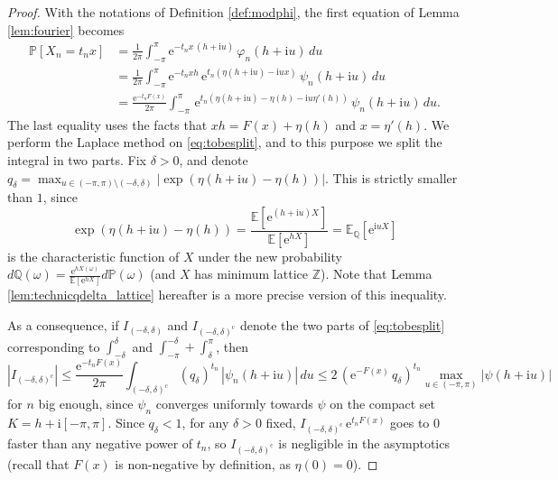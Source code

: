 \documentclass[12pt,a4paper,reqno]{amsart}
\theoremstyle{remark}
\newcommand{\Z}{\mathbb{Z}}
\newcommand{\E}{\mathrm{e}}
\newcommand{\I}{\mathrm{i}}
\newcommand{\esper}{\mathbb{E}}
\newcommand{\proba}{\mathbb{P}}
\begin{document}
\begin{proof}
With the notations of Definition \ref{def:modphi}, the first equation of Lemma \ref{lem:fourier} becomes
\begin{align}\proba[X_{n}=t_{n}x]&=\frac{1}{2\pi}\int_{-\pi}^{\pi} \E^{-t_{n}x\, (h+\I u)}\,\varphi_{n}(h + \I u)\,du\nonumber\\
&=\frac{1}{2\pi}\int_{-\pi}^{\pi} \E^{-t_{n}xh}\,\E^{t_{n}(\eta(h+\I u) - \I u x)}\,\psi_{n}(h + \I u)\,du \nonumber\\
&=\frac{ \E^{-t_{n}F(x)}}{2\pi}\int_{-\pi}^{\pi}\,\E^{t_{n}(\eta(h+\I u) - \eta(h)- \I u \eta'(h))}\,\psi_{n}(h + \I u)\,du.\label{eq:tobesplit}
\end{align}
The last equality uses the facts that $x h=F(x)+\eta(h)$ and $x=\eta'(h)$. We perform the Laplace method on \eqref{eq:tobesplit}, and to this purpose we split the integral in two parts. Fix $\delta >0$, and denote $q_{\delta}=\max_{u \in (-\pi,\pi)\setminus (-\delta,\delta)} |\exp(\eta(h+\I u)-\eta(h))|$. This is strictly smaller than $1$, since
$$\exp(\eta(h+\I u)-\eta(h))=\frac{\esper[\E^{(h+\I u)X}]}{\esper[\E^{hX}]} = \esper_{\mathbb{Q}}[\E^{\I u X}]$$
is the characteristic function of $X$ under the new probability $d\mathbb{Q}(\omega)=\frac{\E^{hX(\omega)}}{\esper[\E^{hX}]}d\mathbb{P}(\omega)$
(and $X$ has minimum lattice $\Z$). Note that Lemma \ref{lem:technicqdelta_lattice} hereafter is a more precise version of this inequality.
\bigskip

As a consequence, if $I_{(-\delta,\delta)}$ and $I_{(-\delta,\delta)^{\mathrm{c}}}$ denote the two parts of \eqref{eq:tobesplit} corresponding to $\int_{-\delta}^{\delta}$ and $\int_{-\pi}^{-\delta}+\int_{\delta}^{\pi}$, then
$$
|I_{(-\delta,\delta)^{\mathrm{c}}}|\leq \frac{ \E^{-t_{n}F(x)}}{2\pi} \int_{(-\delta,\delta)^{\mathrm{c}}} (q_{\delta})^{t_{n}} \,|\psi_{n}(h + \I u)|\,du \leq 2\,(\E^{-F(x)}\,q_{\delta})^{t_{n}} \max_{u \in (-\pi,\pi)} |\psi(h+\I u)|
$$
for $n$ big enough, since $\psi_{n}$ converges uniformly towards $\psi$ on the compact set $K=h+\I[-\pi,\pi]$. Since $q_{\delta}<1$, for any $\delta>0$ fixed, $I_{(-\delta,\delta)^{\mathrm{c}}}\,\E^{t_{n}F(x)}$ goes  to $0$ faster than any negative power of $t_{n}$, so $I_{(-\delta,\delta)^{\mathrm{c}}}$ is negligible in the asymptotics
(recall that $F(x)$ is non-negative by definition, as $\eta(0)=0$).\bigskip


\end{proof}
\end{document}
